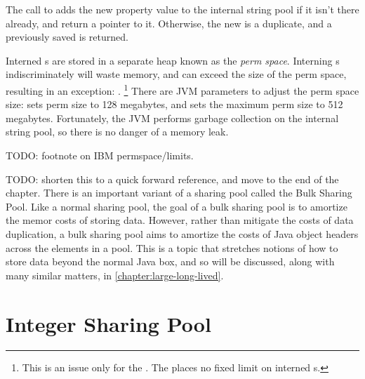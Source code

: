 The call to  adds the new property value 
 to the internal string
pool if it isn't there already, and return a pointer to it. Otherwise, the
new  is a duplicate, and a previously saved  is
returned.

Interned s are stored in a separate heap known as the
\emph{perm space}.
Interning s indiscriminately will waste memory, and can
exceed the size of the perm space, resulting in an exception: .
\footnote{This is an issue only for the \oracle \jre. The \ibm \jre places no
fixed limit on interned s.} There are JVM parameters to adjust the perm
space size:  sets perm size to 128 megabytes, and  sets the maximum perm size to 512 megabytes. Fortunately, the JVM performs garbage collection on the
internal string pool, so there is no danger of a memory leak.

TODO: footnote on IBM permspace/limits.

TODO: shorten this to a quick forward reference, and move to the end of the
chapter. There is an important variant of a sharing pool called the Bulk Sharing
Pool. Like a normal sharing pool, the goal of a bulk sharing pool is to amortize the memor costs of storing data. However, rather than mitigate the costs of data
duplication, a bulk sharing pool aims to amortize the costs of Java object
headers across the elements in a pool. This is a topic that stretches notions of
how to store data beyond the normal Java box, and so will be discussed, along
with many similar matters, in \autoref{chapter:large-long-lived}.

\section{Integer Sharing Pool}

